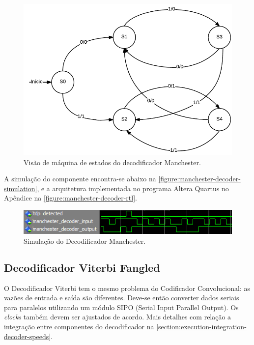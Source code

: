 	\begin{figure}[h]
		\caption{\label{figure:manchester-decoder-flow}Visão de máquina de estados do decodificador Manchester.}
		\centering
		\includegraphics[width=0.25\textheight]{manchester/decoder-flow.pdf}
	\end{figure}

	A simulação do componente encontra-se abaixo na \autoref{figure:manchester-decoder-simulation}, e a arquitetura implementada no programa Altera Quartus no Apêndice na \autoref{figure:manchester-decoder-rtl}.

	\begin{figure}[h]
		\caption{\label{figure:manchester-decoder-simulation}Simulação do Decodificador Manchester.}
		\centering
		\includegraphics[width=0.6\textheight]{manchester/simulation-decoder.png}
	\end{figure}
	
	\subsection{Decodificador Viterbi Fangled}
	
	O Decodificador Viterbi tem o mesmo problema do Codificador Convolucional: as vazões de entrada e saída são diferentes. Deve-se então converter dados seriais para paralelos utilizando um módulo SIPO (Serial Input Parallel Output). Os \textit{clocks} também devem ser ajustados de acordo. Mais detalhes com relação a integração entre componentes do decodificador na \autoref{section:execution-integration-decoder-speeds}.
	
